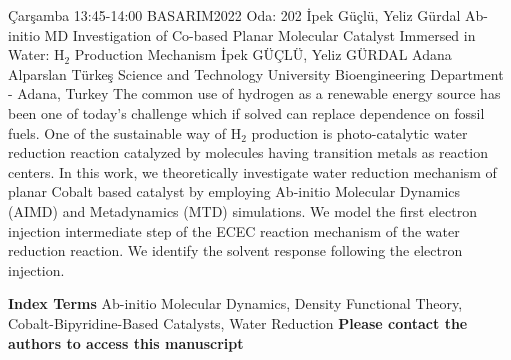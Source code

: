 
    \begin{abstract_basarim}
    {Çarşamba 13:45-14:00}
    {BASARIM2022}
    {Oda: 202}
    {İpek Güçlü, Yeliz Gürdal}
    {Ab-initio MD Investigation of Co-based Planar Molecular Catalyst Immersed in Water: $\mathrm{H}_{2}$ Production Mechanism}
    {%
    İpek GÜÇLÜ, Yeliz GÜRDAL}
    {%
    }
    {%
    Adana Alparslan Türkeş Science and Technology University Bioengineering Department - Adana, Turkey}
    The common use of hydrogen as a renewable energy source has been one of today's challenge which if solved can replace dependence on fossil fuels. One of the sustainable way of $\mathrm{H}_{2}$ production is photo-catalytic water reduction reaction catalyzed by molecules having transition metals as reaction centers. In this work, we theoretically investigate water reduction mechanism of planar Cobalt based catalyst by employing Ab-initio Molecular Dynamics (AIMD) and Metadynamics (MTD) simulations. We model the first electron injection intermediate step of the ECEC reaction mechanism of the water reduction reaction. We identify the solvent response following the electron injection. 
    
            \textbf{Index Terms} \newline{}Ab-initio Molecular Dynamics, Density Functional Theory, Cobalt-Bipyridine-Based Catalysts, Water Reduction
    \newline\newline\noindent \bfseries{Please contact the authors to access this manuscript}
    \end{abstract_basarim}
    